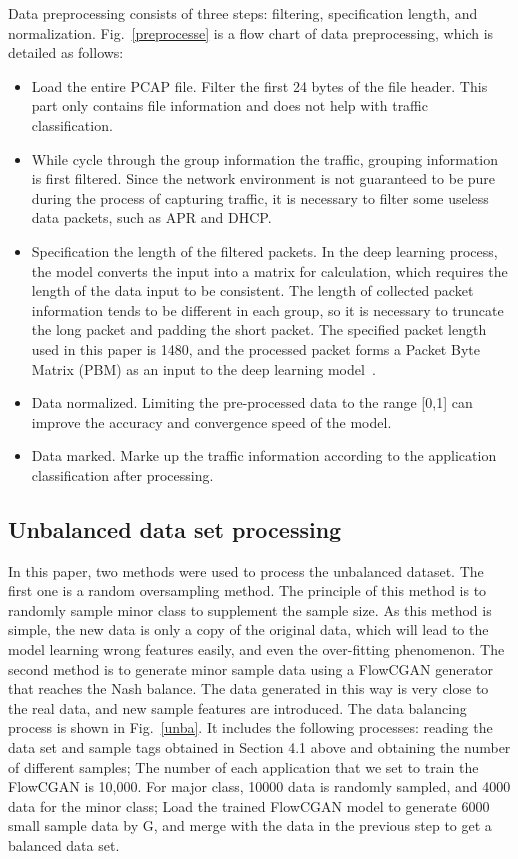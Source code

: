 \documentclass[conference]{IEEEtran}
\begin{document}
Data preprocessing consists of three steps: filtering, specification length, and normalization. Fig.~\ref{preprocesse} is a flow chart of data preprocessing, which is detailed as follows:
\begin{itemize}
\item Load the entire PCAP file. Filter the first 24 bytes of the file header. This part only contains file information and does not help with traffic classification.
\item While cycle through the group information the traffic, grouping information is first filtered. Since the network environment is not guaranteed to be pure during the process of capturing traffic, it is necessary to filter some useless data packets, such as APR and DHCP.
\item Specification the length of the filtered packets. In the deep learning process, the model converts the input into a matrix for calculation, which requires the length of the data input to be consistent. The length of collected packet information tends to be different in each group, so it is necessary to truncate the long packet and padding the short packet. The specified packet length used in this paper is 1480, and the processed packet forms a Packet Byte Matrix (PBM) as an input to the deep learning model~\cite{r8}.
\item Data normalized. Limiting the pre-processed data to the range [0,1] can improve the accuracy and convergence speed of the model.
\item Data marked. Marke up the traffic information according to the application classification after processing.
\end{itemize}


\subsection{Unbalanced data set processing}\label{unbalanced_process}
In this paper, two methods were used to process the unbalanced dataset. The first one is a random oversampling method. The principle of this method is to randomly sample minor class to supplement the sample size. As this method is simple, the new data is only a copy of the original data, which will lead to the model learning wrong features easily, and even the over-fitting phenomenon. The second method is to generate minor sample data using a FlowCGAN generator that reaches the Nash balance. The data generated in this way is very close to the real data, and new sample features are introduced. The data balancing process is shown in Fig.~\ref{unba}. It includes the following processes: reading the data set and sample tags obtained in Section 4.1 above and obtaining the number of different samples; The number of each application that we set to train the FlowCGAN is 10,000. For major class, 10000 data is randomly sampled, and 4000 data for the minor class; Load the trained FlowCGAN model to generate 6000 small sample data by G, and merge with the data in the previous step to get a balanced data set.
\end{document}
